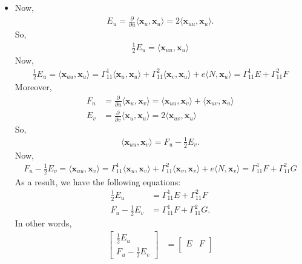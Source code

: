 \documentclass[10pt]{article}
\newcommand{\ve}[1]{\mathbf{#1}}
\begin{document}
\begin{itemize}
    \item Now,
    \begin{align*}
      E_u = \frac{\partial}{\partial u} \langle \ve{x}_u, \ve{x}_u \rangle = 2\langle \ve{x}_{uu}, \ve{x}_u \rangle.
    \end{align*}  
    So,
    \begin{align*}
      \frac{1}{2}E_u = \langle \ve{x}_{uu}, \ve{x}_u \rangle
    \end{align*}
    Now,
    \begin{align*}
      \frac{1}{2} E_u = \langle \ve{x}_{uu}, \ve{x}_u \rangle
      = \Gamma_{11}^1 \langle \ve{x}_u, \ve{x}_u \rangle + \Gamma_{11}^2 \langle \ve{x}_v, \ve{x}_u \rangle + e \langle N, \ve{x}_u \rangle
      = \Gamma_{11}^1 E + \Gamma_{11}^2 F
    \end{align*}
    Moreover,
    \begin{align*}
      F_u &= \frac{\partial}{\partial u} \langle \ve{x}_u, \ve{x}_v \rangle = \langle \ve{x}_{uu}, \ve{x}_v \rangle + \langle \ve{x}_{uv}, \ve{x}_{u} \rangle\\
      E_v &= \frac{\partial}{\partial v} \langle \ve{x}_u, \ve{x}_u \rangle = 2 \langle \ve{x}_{uv}, \ve{x}_u \rangle
    \end{align*}
    So,
    \begin{align*}
      \langle \ve{x}_{uu}, \ve{x}_v \rangle = F_u - \frac{1}{2} E_v.
    \end{align*}
    Now,
    \begin{align*}
      F_u - \frac{1}{2} E_v 
      = \langle \ve{x}_{uu}, \ve{x}_v \rangle 
      = \Gamma_{11}^1 \langle \ve{x}_u, \ve{x}_v \rangle + \Gamma_{11}^2 \langle \ve{x}_v, \ve{x}_v \rangle + e \langle N, \ve{x}_v \rangle
      = \Gamma_{11}^1 F + \Gamma_{11}^2 G 
    \end{align*}
    As a result, we have the following equations:
    \begin{align*}
      \frac{1}{2} E_u &= \Gamma_{11}^1 E + \Gamma_{11}^2 F\\
      F_u - \frac{1}{2} E_v &= \Gamma_{11}^1 F + \Gamma_{11}^2 G.
    \end{align*}
    In other words,
    \begin{align*}
      \begin{bmatrix}
        \frac{1}{2}E_u \\
        F_u - \frac{1}{2} E_v        
      \end{bmatrix}
      &=
      \begin{bmatrix}
        E & F\\

\end{bmatrix}
\end{align*}
\end{itemize}
\end{document}
